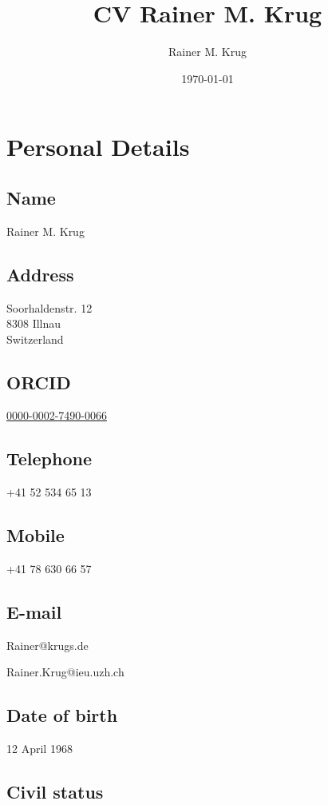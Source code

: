 \documentclass[a4paper]{article}
\author{Rainer M. Krug}
\date{\today}
\title{CV Rainer M. Krug}
\begin{document}
\maketitle


\section{Personal Details}

\subsection{Name}

Rainer M. Krug

\subsection{Address}

Soorhaldenstr. 12 \\
8308 Illnau \\
Switzerland

\subsection{ORCID}

\href{https://orcid.org/0000-0002-7490-0066}{0000-0002-7490-0066}

\subsection{Telephone}

+41 52 534 65 13

\subsection{Mobile}

+41 78 630 66 57

\subsection{E-mail}

Rainer@krugs.de

Rainer.Krug@ieu.uzh.ch

\subsection{Date of birth}

12 April 1968
\subsection{Civil status}
\end{document}
